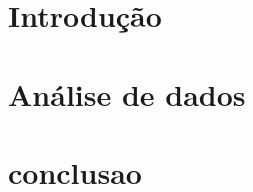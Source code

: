 \documentclass[11pt]{article}
\begin{document}


\newpage{}
\tableofcontents{}
\newpage{}

\section{Introdução}


\section{Análise de dados}





\section{conclusao}

\end{document}
